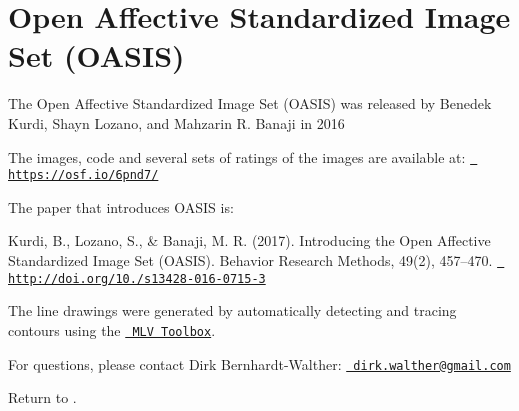 \chapter{Open Affective Standardized Image Set (OASIS)}
\hypertarget{md_data_sets_2_o_a_s_i_s_2_o_a_s_i_s___readme}{}\label{md_data_sets_2_o_a_s_i_s_2_o_a_s_i_s___readme}
\label{md_data_sets_2_o_a_s_i_s_2_o_a_s_i_s___readme_autotoc_md2}%
%
 The Open Affective Standardized Image Set (OASIS) was released by Benedek Kurdi, Shayn Lozano, and Mahzarin R. Banaji in 2016

The images, code and several sets of ratings of the images are available at\+: \href{https://osf.io/6pnd7/}{\texttt{ https\+://osf.\+io/6pnd7/}}

The paper that introduces OASIS is\+:

Kurdi, B., Lozano, S., \& Banaji, M. R. (2017). Introducing the Open Affective Standardized Image Set (OASIS). Behavior Research Methods, 49(2), 457–470. \href{http://doi.org/10.3758/s13428-016-0715-3}{\texttt{ http\+://doi.\+org/10./s13428-\/016-\/0715-\/3}}

The line drawings were generated by automatically detecting and tracing contours using the \href{http://mlvtoolbox.org}{\texttt{ MLV Toolbox}}.

For questions, please contact Dirk Bernhardt-\/\+Walther\+: \href{mailto:dirk.walther@gmail.com}{\texttt{ dirk.\+walther@gmail.\+com}}

Return to . 
